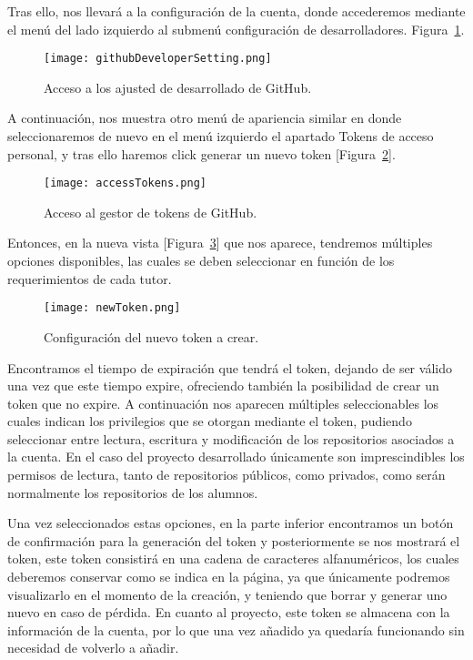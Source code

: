 Tras ello, nos llevará a la configuración de la cuenta, donde accederemos mediante el menú del lado izquierdo al submenú configuración de desarrolladores. Figura~\ref{figure:developerSettings}.

\begin{figure}[h!]
  \texttt{[image: githubDeveloperSetting.png]}
  \caption{Acceso a los ajusted de desarrollado de GitHub.}
  \label{figure:developerSettings}
\end{figure}

A continuación, nos muestra otro menú de apariencia similar en donde seleccionaremos de nuevo en el menú izquierdo el apartado Tokens de acceso personal, y tras ello haremos click generar un nuevo token [Figura~\ref{figure:tokensGitHub}].

\begin{figure}[h!]
  \texttt{[image: accessTokens.png]}
  \caption{Acceso al gestor de tokens de GitHub.}
  \label{figure:tokensGitHub}
\end{figure}

Entonces, en la nueva vista [Figura~\ref{figure:configToken}] que nos aparece, tendremos múltiples opciones disponibles, las cuales se deben seleccionar en función de los requerimientos de cada tutor.
\begin{figure}[h!]
  \texttt{[image: newToken.png]}
  \caption{Configuración del nuevo token a crear.}
  \label{figure:configToken}
\end{figure}

Encontramos el tiempo de expiración que tendrá el token, dejando de ser válido una vez que este tiempo expire, ofreciendo también la posibilidad de crear un token que no expire. A continuación nos aparecen múltiples seleccionables los cuales indican los privilegios que se otorgan mediante el token, pudiendo seleccionar entre lectura, escritura y modificación de los repositorios asociados a la cuenta. En el caso del proyecto desarrollado únicamente son imprescindibles los permisos de lectura, tanto de repositorios públicos, como privados, como serán normalmente los repositorios de los alumnos.

Una vez seleccionados estas opciones, en la parte inferior encontramos un botón de confirmación para la generación del token y posteriormente se nos mostrará el token, este token consistirá en una cadena de caracteres alfanuméricos, los cuales deberemos conservar como se indica en la página, ya que únicamente podremos visualizarlo en el momento de la creación, y teniendo que borrar y generar uno nuevo en caso de pérdida. En cuanto al proyecto, este token se almacena con la información de la cuenta, por lo que una vez añadido ya quedaría funcionando sin necesidad de volverlo a añadir.

